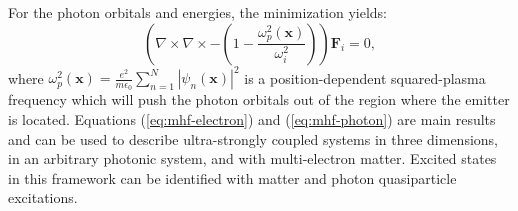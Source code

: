 \documentclass[aps,prl,twocolumn,
	groupedaddress,superscriptaddress,
	amsfonts,amssymb,amsmath,floatfix,
	citeautoscript]{revtex4-1}
\begin{document}
For the photon orbitals and energies, the minimization yields:
\begin{equation}
\left( \nabla\times\nabla\times - \left(1-\frac{\omega_p^2(\mathbf{x})}{\omega_i^2} \right)\right)\mathbf{F}_i = 0,
\label{eq:mhf-photon}
\end{equation}
where $\omega_p^2(\mathbf{x}) = \frac{e^2}{m\epsilon_0}\sum\limits_{n=1}^N |\psi_n(\mathbf{x})|^2$ is a position-dependent squared-plasma frequency which will push the photon orbitals out of the region where the emitter is located. Equations (\ref{eq:mhf-electron}) and (\ref{eq:mhf-photon}) are main results and can be used to describe ultra-strongly coupled systems in three dimensions, in an arbitrary photonic system, and with multi-electron matter. Excited states in this framework can be identified with matter and photon quasiparticle excitations.
\end{document}
